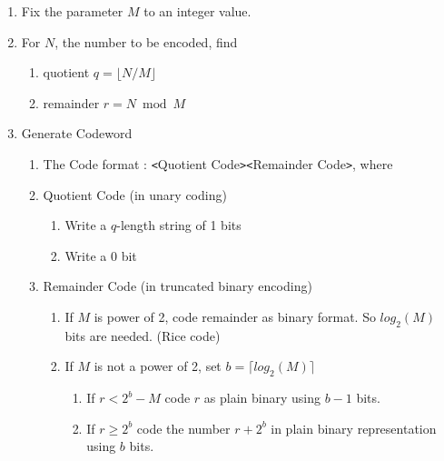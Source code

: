 \documentclass[a4paper]{article}
\begin{document}
\begin{enumerate}
\item Fix the parameter $M$ to an integer value.

\item For $N$, the number to be encoded, find

\begin{enumerate}
\item quotient $q = \lfloor N/M \rfloor$

\item remainder $r = N \bmod M$
\end{enumerate}

\item Generate Codeword

\begin{enumerate}
\item The Code format : \texttt{<}Quotient Code\texttt{>}\texttt{<}Remainder Code\texttt{>}, 
where

\item Quotient Code (in unary coding)

\begin{enumerate}
\item Write a $q$-length string of 1 bits

\item Write a 0 bit
\end{enumerate}

\item Remainder Code (in truncated binary encoding)

\begin{enumerate}
\item If $M$ is power of 2, code remainder as binary format. So $log_{2}(M)$ bits are needed. (Rice code)  

\item If $M$ is not a power of 2, set $b=\lceil log_{2}(M) \rceil$

\begin{enumerate}
\item If $r < 2^{b}-M$ code $r$ as plain binary using $b-1$ bits.

\item If $r \ge 2^{b}$ code the number $r+2^{b}$ in plain binary representation 
using $b$ bits.
\end{enumerate}
\end{enumerate}
\end{enumerate}
\end{enumerate}
\end{document}
